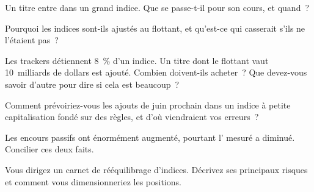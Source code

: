 \begin{interviewq}\label{iq:m1:index-construction-and-rebalancing:1}
Un titre entre dans un grand indice. Que se passe-t-il pour son cours, et quand~?
\end{interviewq}

\begin{interviewq}\label{iq:m1:index-construction-and-rebalancing:2}
Pourquoi les indices sont-ils ajustés au flottant, et qu'est-ce qui casserait s'ils ne l'étaient pas~?
\end{interviewq}

\begin{interviewq}\label{iq:m1:index-construction-and-rebalancing:3}
Les trackers détiennent 8~\% d'un indice. Un titre dont le flottant vaut 10~milliards de dollars est ajouté.
Combien doivent-ils acheter~? Que devez-vous savoir d'autre pour dire si cela est
beaucoup~?
\end{interviewq}

\begin{interviewq}\label{iq:m1:index-construction-and-rebalancing:4}
Comment prévoiriez-vous les ajouts de juin prochain dans un indice à petite capitalisation fondé sur des règles,
et d'où viendraient vos erreurs~?
\end{interviewq}

\begin{interviewq}\label{iq:m1:index-construction-and-rebalancing:5}
Les encours passifs ont énormément augmenté, pourtant l' mesuré a
diminué. Concilier ces deux faits.
\end{interviewq}

\begin{interviewq}\label{iq:m1:index-construction-and-rebalancing:6}
Vous dirigez un carnet de rééquilibrage d'indices. Décrivez ses principaux risques et comment vous
dimensionneriez les positions.
\end{interviewq}
